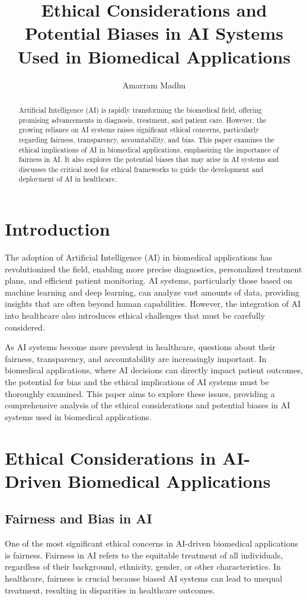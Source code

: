 \documentclass{article}
\title{Ethical Considerations and Potential Biases in AI Systems Used in Biomedical Applications}
\author{Amarram Madhu}
\date{}
\begin{document}
\maketitle

\begin{abstract}
Artificial Intelligence (AI) is rapidly transforming the biomedical field, offering promising advancements in diagnosis, treatment, and patient care. However, the growing reliance on AI systems raises significant ethical concerns, particularly regarding fairness, transparency, accountability, and bias. This paper examines the ethical implications of AI in biomedical applications, emphasizing the importance of fairness in AI. It also explores the potential biases that may arise in AI systems and discusses the critical need for ethical frameworks to guide the development and deployment of AI in healthcare.
\end{abstract}

\section{Introduction}
The adoption of Artificial Intelligence (AI) in biomedical applications has revolutionized the field, enabling more precise diagnostics, personalized treatment plans, and efficient patient monitoring. AI systems, particularly those based on machine learning and deep learning, can analyze vast amounts of data, providing insights that are often beyond human capabilities. However, the integration of AI into healthcare also introduces ethical challenges that must be carefully considered.

As AI systems become more prevalent in healthcare, questions about their fairness, transparency, and accountability are increasingly important. In biomedical applications, where AI decisions can directly impact patient outcomes, the potential for bias and the ethical implications of AI systems must be thoroughly examined. This paper aims to explore these issues, providing a comprehensive analysis of the ethical considerations and potential biases in AI systems used in biomedical applications.

\section{Ethical Considerations in AI-Driven Biomedical Applications}

\subsection{Fairness and Bias in AI}
One of the most significant ethical concerns in AI-driven biomedical applications is fairness. Fairness in AI refers to the equitable treatment of all individuals, regardless of their background, ethnicity, gender, or other characteristics. In healthcare, fairness is crucial because biased AI systems can lead to unequal treatment, resulting in disparities in healthcare outcomes.
\end{document}

